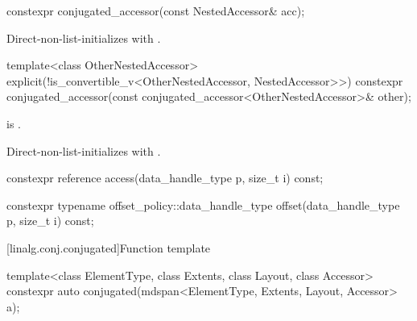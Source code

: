 \begin{itemdecl}
constexpr conjugated_accessor(const NestedAccessor& acc);
\end{itemdecl}

\begin{itemdescr}
\pnum
\effects
Direct-non-list-initializes
 with .
\end{itemdescr}

\begin{itemdecl}
template<class OtherNestedAccessor>
  explicit(!is_convertible_v<OtherNestedAccessor, NestedAccessor>>)
    constexpr conjugated_accessor(const conjugated_accessor<OtherNestedAccessor>& other);
\end{itemdecl}

\begin{itemdescr}
\pnum
\constraints
{}
is .

\pnum
\effects
Direct-non-list-initializes 
with .
\end{itemdescr}

\begin{itemdecl}
constexpr reference access(data_handle_type p, size_t i) const;
\end{itemdecl}

\begin{itemdescr}
\pnum
\returns
{}
\end{itemdescr}

\begin{itemdecl}
constexpr typename offset_policy::data_handle_type offset(data_handle_type p, size_t i) const;
\end{itemdecl}

\begin{itemdescr}
\pnum
\returns
{}
\end{itemdescr}

[linalg.conj.conjugated]{Function template }

\begin{itemdecl}
  template<class ElementType, class Extents, class Layout, class Accessor>
    constexpr auto conjugated(mdspan<ElementType, Extents, Layout, Accessor> a);
\end{itemdecl}

